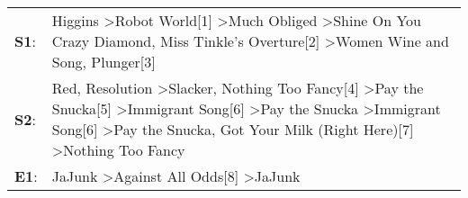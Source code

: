 \begin{supertabular}{p{0.03\textwidth}p{0.92\textwidth}}
 \textbf{S1}:  &                                                                                                                                                                                                              Higgins\textsuperscript{} \textgreater \enspace Robot World[1]\textsuperscript{} \textgreater \enspace Much Obliged\textsuperscript{} \textgreater \enspace Shine On You Crazy Diamond\textsuperscript{}, \enspace Miss Tinkle's Overture[2]\textsuperscript{} \textgreater \enspace Women Wine and Song\textsuperscript{}, \enspace Plunger[3]\textsuperscript{}  \enspace  \\
 \textbf{S2}:  &  Red\textsuperscript{}, \enspace Resolution\textsuperscript{} \textgreater \enspace Slacker\textsuperscript{}, \enspace Nothing Too Fancy[4]\textsuperscript{} \textgreater \enspace Pay the Snucka[5]\textsuperscript{} \textgreater \enspace Immigrant Song[6]\textsuperscript{} \textgreater \enspace Pay the Snucka\textsuperscript{} \textgreater \enspace Immigrant Song[6]\textsuperscript{} \textgreater \enspace Pay the Snucka\textsuperscript{}, \enspace Got Your Milk (Right Here)[7]\textsuperscript{} \textgreater \enspace Nothing Too Fancy\textsuperscript{}  \enspace  \\
 \textbf{E1}:  &                                                                                                                                                                                                                                                                                                                                                                                                                                            JaJunk\textsuperscript{} \textgreater \enspace Against All Odds[8]\textsuperscript{} \textgreater \enspace JaJunk\textsuperscript{}  \enspace  \\
\end{supertabular}
